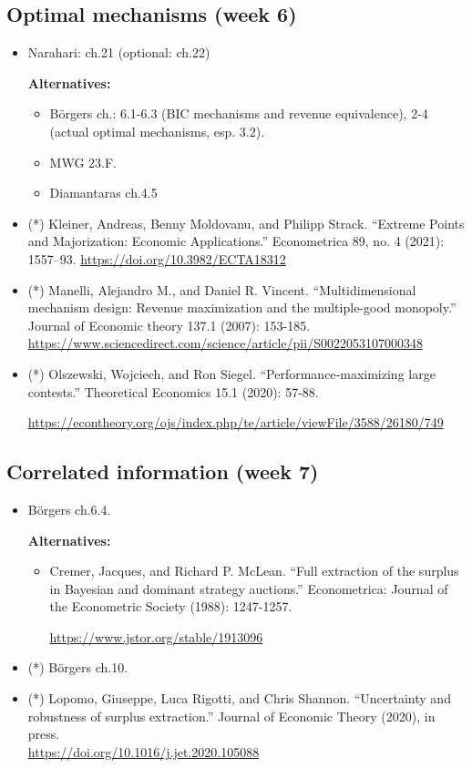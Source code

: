 \documentclass{article}
\begin{document}
\subsection{Optimal mechanisms (week 6)}
\begin{itemize}
	\item Narahari: ch.21 (optional: ch.22)
	
	\textbf{Alternatives:}
	\begin{itemize}
		\item B{\"o}rgers ch.: 6.1-6.3 (BIC mechanisms and revenue equivalence), 2-4 (actual optimal mechanisms, esp. 3.2).
		\item MWG 23.F.
		\item Diamantaras ch.4.5
	\end{itemize}
	\item (*) Kleiner, Andreas, Benny Moldovanu, and Philipp Strack. “Extreme Points and Majorization: Economic Applications.” Econometrica 89, no. 4 (2021): 1557–93. \url{https://doi.org/10.3982/ECTA18312}
	\item (*) Manelli, Alejandro M., and Daniel R. Vincent. ``Multidimensional mechanism design: Revenue maximization and the multiple-good monopoly.'' Journal of Economic theory 137.1 (2007): 153-185. \url{https://www.sciencedirect.com/science/article/pii/S0022053107000348}
	\item (*) Olszewski, Wojciech, and Ron Siegel. ``Performance‐maximizing large contests.'' Theoretical Economics 15.1 (2020): 57-88.
	
	\url{https://econtheory.org/ojs/index.php/te/article/viewFile/3588/26180/749}
\end{itemize}

\subsection{Correlated information (week 7)}
\begin{itemize}
	\item B{\"o}rgers ch.6.4.
	
	\textbf{Alternatives:}
	\begin{itemize}
		\item Cremer, Jacques, and Richard P. McLean. ``Full extraction of the surplus in Bayesian and dominant strategy auctions.'' Econometrica: Journal of the Econometric Society (1988): 1247-1257.
		
		\url{https://www.jstor.org/stable/1913096}
	\end{itemize}
	
	\item (*) B{\"o}rgers ch.10.
	
	\item (*) Lopomo, Giuseppe, Luca Rigotti, and Chris Shannon. ``Uncertainty and robustness of surplus extraction.'' Journal of Economic Theory (2020), in press. \\
	\url{https://doi.org/10.1016/j.jet.2020.105088}
\end{itemize}
\end{document}
